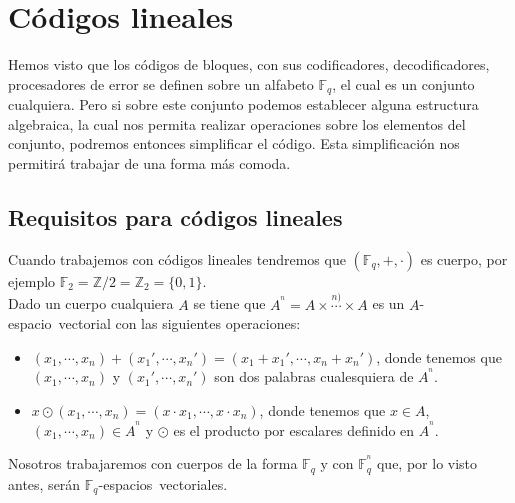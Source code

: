 %
%

\chapter{C\'odigos lineales}

Hemos visto que los c\'odigos de bloques, con sus codificadores,
decodificadores, procesadores de error se definen sobre un alfabeto
$\mathbb{F}_q$, el cual es un conjunto cualquiera. Pero si sobre este
conjunto podemos establecer alguna estructura algebraica, la cual nos permita
realizar operaciones sobre los elementos del conjunto, podremos entonces
simplificar el c\'odigo. Esta simplificaci\'on nos permitir\'a trabajar de
una forma m\'as comoda.

\section{Requisitos para c\'odigos lineales}

Cuando trabajemos con c\'odigos lineales tendremos que $(\mathbb{F}_q,+,\cdot)$
es cuerpo, por ejemplo $\mathbb{F}_2=\mathbb{Z}/2=\mathbb{Z}_2=\{0,1\}$.\\

Dado un cuerpo cualquiera $A$ se tiene que $A^{^n}=A\times \stackrel{n)}\cdots
\times A$ es un \mbox{$A$-espacio vectorial} con las siguientes operaciones:
\begin{itemize}
\item $(x_1,\cdots,x_n)+(x_1',\cdots,x_n')=(x_1+x_1',\cdots,x_n+x_n')$, donde
tenemos que $(x_1,\cdots,x_n)$ y $(x_1',\cdots,x_n')$ son dos palabras
cualesquiera de $A^{^n}$.
\item $x\odot (x_1,\cdots,x_n)=(x\cdot x_1,\cdots, x\cdot x_n)$, donde
tenemos que $x\in A$, $(x_1,\cdots,x_n)\in A^{^n}$ y $\odot$ es el producto
por escalares definido en $A^{^n}$.
\end{itemize}
Nosotros trabajaremos con cuerpos de la forma $\mathbb{F}_q$ y con
$\mathbb{F}^{^n}_q$ que, por lo visto antes, ser\'an
\mbox{$\mathbb{F}_q$-espacios vectoriales}.

%
%



%
%



%
%



%
%



%
%



%
%


